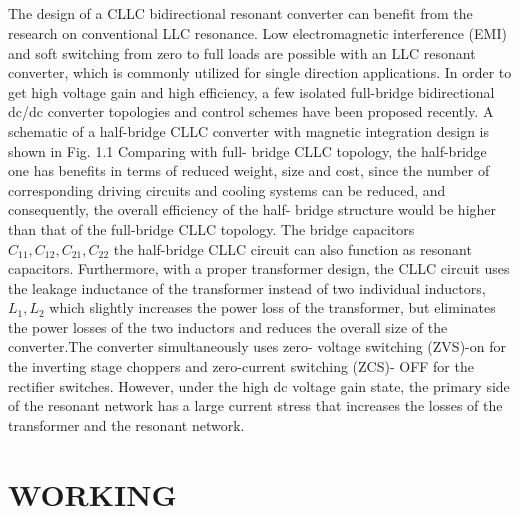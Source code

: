 \documentclass{book}
\begin{document}
	\paragraph{}
    \vspace{0.5cm}
	The design of a CLLC bidirectional resonant converter can benefit from the research on conventional LLC resonance. Low electromagnetic interference (EMI) and soft switching from zero to full loads are possible with an LLC resonant converter, which is commonly utilized for single direction applications.
In order to get high voltage gain and high efficiency, a few isolated full-bridge bidirectional dc/dc converter topologies and control schemes have been proposed recently. A schematic of a half-bridge CLLC converter with magnetic
integration design is shown in Fig. 1.1 Comparing with full-
bridge CLLC topology, the half-bridge one has benefits in terms
of reduced weight, size and cost, since the number of
corresponding driving circuits and cooling systems can be
reduced, and consequently, the overall efficiency of the half-
bridge structure would be higher than that of the full-bridge
CLLC topology. The bridge capacitors \( C_{11}, C_{12},C_{21},C_{22}  \)
the half-bridge CLLC circuit can also function as resonant
capacitors. Furthermore, with a proper transformer design, the
CLLC circuit uses the leakage inductance of the transformer
instead of two individual inductors, \(L_{1},L_{2}\)  which slightly
increases the power loss of the transformer, but eliminates the
power losses of the two inductors and reduces the overall size of the converter.The converter simultaneously uses zero-
voltage switching (ZVS)-on for the inverting stage choppers
and zero-current switching (ZCS)- OFF for the rectifier switches.
However, under the high dc voltage gain state, the primary side
of the resonant network has a large current stress that increases
the losses of the transformer and the resonant network.

	
	\chapter{WORKING }
\end{document}
